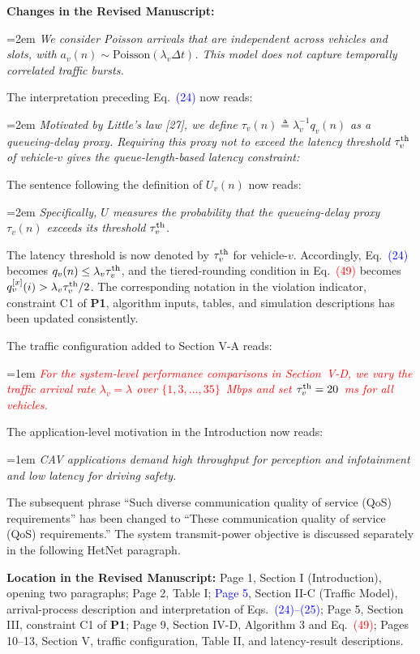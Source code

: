 \documentclass[11pt]{article}
\newenvironment{reviewedit}[1]
{\colorlet{responseblue}{#1}\colorlet{changeblue}{#1}\color{#1}}
{}
\newenvironment{manuscriptchanges}
{\par\noindent\textcolor{changeblue}{\textbf{Changes in the Revised Manuscript:}}\par\color{changeblue}}
{\par}
\newcommand{\revisionlocation}[1]{%
  \par\noindent\textbf{Location in the Revised Manuscript:} #1\par
}
\begin{document}
\begin{reviewedit}{blue}
\begin{manuscriptchanges}
{\emergencystretch=2em
\emph{We consider Poisson arrivals that are independent across vehicles and slots, with $a_v(n)\sim\mathrm{Poisson} (\lambda_v\Delta t)$. This model does not capture temporally correlated traffic bursts.}\par}

The interpretation preceding Eq.~\textcolor{blue}{(24)} now reads:

{\emergencystretch=2em
\emph{Motivated by Little's law [27], we define $\tau_v(n)\triangleq\lambda_v^{-1}q_v(n)$ as a queueing-delay proxy. Requiring this proxy not to exceed the latency threshold $\tau_v^{\rm th}$ of  vehicle-$v$  gives the queue-length-based latency constraint:}\par}

The sentence following the definition of $U_v(n)$ now reads:

{\emergencystretch=2em
\emph{Specifically, $U$ measures the probability that the queueing-delay proxy $\tau_v(n)$ exceeds its threshold $\tau_v^{\rm th}$.}\par}

The latency threshold is now denoted by $\tau_v^{\rm th}$ for vehicle-$v$.
Accordingly, Eq.~\textcolor{blue}{(24)} becomes $q_v(n)\leq\lambda_v\tau_v^{\rm th}$, and the
tiered-rounding condition in Eq.~\textcolor{red}{(49)} becomes
$q_v^{[x]}(i)>\lambda_v\tau_v^{\rm th}/2$.
The corresponding notation in the violation indicator, constraint C1 of
\textbf{P1}, algorithm inputs, tables, and simulation descriptions has been
updated consistently.

The traffic configuration added to Section V-A reads:

{\emergencystretch=1em
\textcolor{red}{\emph{For the system-level performance comparisons in Section~V-D, we vary the traffic arrival rate $\lambda_v=\lambda$ over $\{1,3,\ldots,35\}$~Mbps and set $\tau_v^{\rm th}=20$~ms for all vehicles.}}\par}

The application-level motivation in the Introduction now reads:

{\emergencystretch=1em
\emph{CAV applications demand high throughput for perception and infotainment and low latency for driving safety.}\par}
The subsequent phrase ``Such diverse communication quality of service (QoS)
requirements'' has been changed to ``These communication quality of service (QoS)
requirements.'' The system transmit-power objective is discussed separately in
the following HetNet paragraph.
\end{manuscriptchanges}
\revisionlocation{Page 1, Section I (Introduction), opening two paragraphs;
Page 2, Table I;
\textcolor{blue}{Page 5}, Section II-C (Traffic Model), arrival-process description and interpretation of Eqs.~\textcolor{blue}{(24)--(25)};
Page 5, Section III, constraint C1 of \textbf{P1};
Page 9, Section IV-D, Algorithm 3 and Eq.~\textcolor{red}{(49)};
Pages 10--13, Section V, traffic configuration, Table II, and latency-result descriptions.}
\end{reviewedit}
\end{document}

